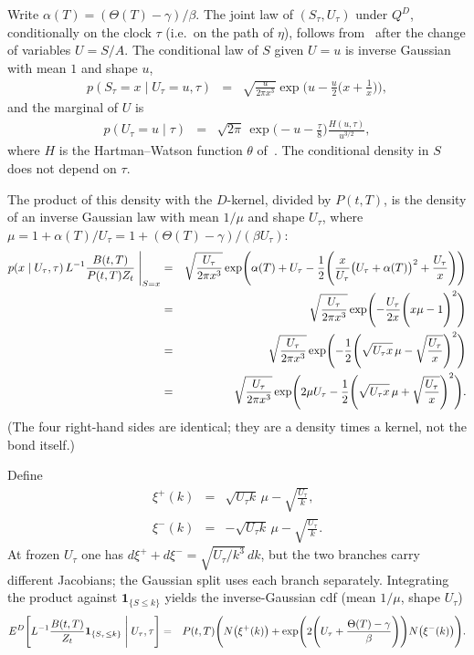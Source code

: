 \documentclass[12pt,a4paper,final]{article}
\theoremstyle{plain}
\begin{document}
Write $\alpha(T)=(\Theta(T)-\gamma)/\beta$. The joint law of
$(S_{\tau},U_{\tau})$ under $Q^{D}$, conditionally on the clock $\tau$ (i.e.\
on the path of $\eta$), follows from~\cite[Thm.~4.1]{YOR} after the change of
variables $U=S/A$. The conditional law of $S$ given $U=u$ is inverse Gaussian
with mean $1$ and shape $u$,
\begin{eqnarray*}
p(S_{\tau}=x\mid U_{\tau}=u,\tau)
&=&\sqrt{\frac{u}{2\pi x^{3}}}
\exp\Biggl(u-\frac{u}{2}\Biggl(x+\frac{1}{x}\Biggr)\Biggr),
\end{eqnarray*}
and the marginal of $U$ is
\begin{eqnarray*}
p(U_{\tau}=u\mid\tau)
&=&\sqrt{2\pi}\,\exp\Biggl(-u-\frac{\tau}{8}\Biggr)
\frac{H(u,\tau)}{u^{3/2}},
\end{eqnarray*}
where $H$ is the Hartman--Watson function $\theta$ of~\cite{YOR}. The
conditional density in $S$ does not depend on $\tau$.

The product of this density with the $D$-kernel, divided by $P(t,T)$, is the
density of an inverse Gaussian law with mean $1/\mu$ and shape $U_{\tau}$,
where $\mu=1+\alpha(T)/U_{\tau}=1+(\Theta(T)-\gamma)/(\beta U_{\tau})$:
\begin{eqnarray*}
p(x\mid U_{\tau},\tau)\,
L^{-1}\frac{B(t,T)}{P(t,T)Z_t}\Biggm|_{S=x}
&=&\sqrt{\frac{U_{\tau}}{2\pi x^{3}}}
\exp\Biggl(
\alpha(T)+U_{\tau}
-\frac12\Biggl(
\frac{x}{U_{\tau}}
\bigl(U_{\tau}+\alpha(T)\bigr)^{2}
+\frac{U_{\tau}}{x}
\Biggr)
\Biggr)\\
&=&\sqrt{\frac{U_{\tau}}{2\pi x^{3}}}
\exp\Biggl(
-\frac{U_{\tau}}{2x}
\Biggl(x\mu-1\Biggr)^{2}
\Biggr)\\
&=&\sqrt{\frac{U_{\tau}}{2\pi x^{3}}}
\exp\Biggl(
-\frac12\Biggl(\sqrt{U_{\tau}x}\,\mu-\sqrt{\frac{U_{\tau}}{x}}\Biggr)^{2}
\Biggr)\\
&=&\sqrt{\frac{U_{\tau}}{2\pi x^{3}}}
\exp\Biggl(
2\mu U_{\tau}
-\frac12\Biggl(\sqrt{U_{\tau}x}\,\mu+\sqrt{\frac{U_{\tau}}{x}}\Biggr)^{2}
\Biggr).
\end{eqnarray*}
(The four right-hand sides are identical; they are a density times a kernel,
not the bond itself.)

Define
\begin{eqnarray*}
\xi^{+}(k)&=&\sqrt{U_{\tau}k}\,\mu-\sqrt{\frac{U_{\tau}}{k}},\\
\xi^{-}(k)&=&-\sqrt{U_{\tau}k}\,\mu-\sqrt{\frac{U_{\tau}}{k}}.
\end{eqnarray*}
At frozen $U_{\tau}$ one has $d\xi^{+}+d\xi^{-}=\sqrt{U_{\tau}/k^{3}}\,dk$,
but the two branches carry different Jacobians; the Gaussian split uses each
branch separately. Integrating the product against $\mathbf{1}_{\{S\le k\}}$
yields the inverse-Gaussian cdf (mean $1/\mu$, shape $U_{\tau}$)
\begin{eqnarray*}
E^{D}\Biggl[
L^{-1}\frac{B(t,T)}{Z_t}
\mathbf{1}_{\{S_{\tau}\le k\}}
\Biggm|U_{\tau},\tau\Biggr]
&=&P(t,T)
\Biggl(
N\bigl(\xi^{+}(k)\bigr)
+\exp\Biggl(2\Biggl(U_{\tau}+\frac{\Theta(T)-\gamma}{\beta}\Biggr)\Biggr)
N\bigl(\xi^{-}(k)\bigr)
\Biggr).
\end{eqnarray*}
\end{document}
